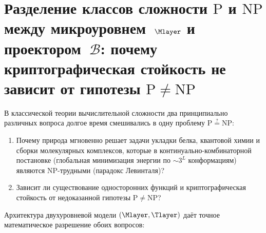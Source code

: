 \section{Разделение классов сложности \texorpdfstring{$\mathrm{P}$}{P} и \texorpdfstring{$\mathrm{NP}$}{NP} между микроуровнем~\texorpdfstring{$\Mlayer$}{M} и проектором~\texorpdfstring{$\mathcal{B}$}{B}: почему криптографическая стойкость не зависит от гипотезы \texorpdfstring{$\mathrm{P}\neq\mathrm{NP}$}{P != NP}}
\label{sec:compute-p-vs-np-cryptography}

В классической теории вычислительной сложности два принципиально различных вопроса долгое время смешивались в одну проблему $\mathrm{P}\stackrel{?}{=}\mathrm{NP}$:
\begin{enumerate}[noitemsep]
\item Почему природа мгновенно решает задачи укладки белка, квантовой химии и сборки молекулярных комплексов, которые в континуально-комбинаторной постановке (глобальная минимизация энергии по $\sim 3^L$ конформациям) являются $\mathrm{NP}$-трудными (парадокс Левинталя)?
\item Зависит ли существование односторонних функций и криптографическая стойкость от недоказанной гипотезы $\mathrm{P}\neq\mathrm{NP}$?
\end{enumerate}

Архитектура двухуровневой модели $(\Mlayer, \Tlayer)$ даёт точное математическое разрешение обоих вопросов:

